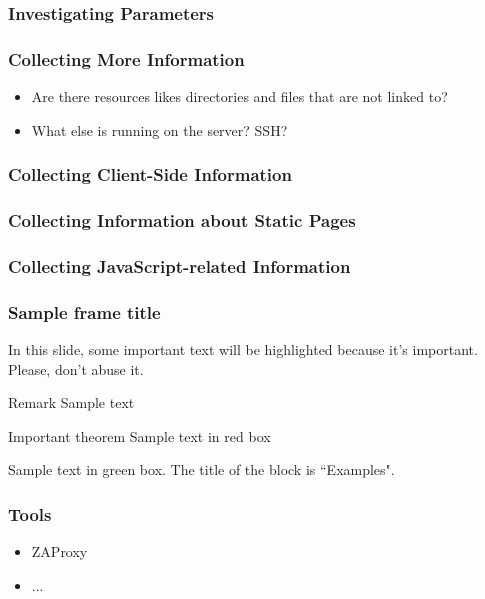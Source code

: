 \documentclass[aspectratio=169]{beamer}
\begin{document}
\begin{frame}
    \frametitle{Investigating Parameters}

\end{frame}

\begin{frame}
    \frametitle{Collecting More Information}
   \begin{itemize}
       \item Are there resources likes directories and files that are not linked to?
       \item What else is running on the server? SSH?
   \end{itemize}
\end{frame}

\begin{frame}
    \frametitle{Collecting Client-Side Information}

\end{frame}

\begin{frame}
    \frametitle{Collecting Information about Static Pages}
\end{frame}

\begin{frame}
    \frametitle{Collecting JavaScript-related Information}
\end{frame}

\begin{frame}
    \frametitle{Sample frame title}
    
    In this slide, some important text will be
    \alert{highlighted} because it's important.
    Please, don't abuse it.
    
    \begin{block}{Remark}
    Sample text
    \end{block}
    
    \begin{alertblock}{Important theorem}
    Sample text in red box
    \end{alertblock}
    
    \begin{examples}
    Sample text in green box. The title of the block is ``Examples".
    \end{examples}

\end{frame}

\begin{frame}
    \frametitle{Tools}
    \begin{itemize}
        \item ZAProxy
        \item ...
    \end{itemize}
\end{frame}
\end{document}
